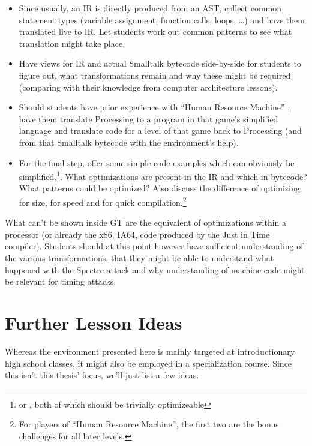 \begin{instructions}
\begin{itemize}
\item Since usually, an \ac{IR} is directly produced from an \ac{AST}, collect common statement types (variable assignment, function calls, loops, \dots) and have them translated live to \ac{IR}. Let students work out common patterns to see what translation might take place.
\item Have views for \ac{IR} and actual Smalltalk bytecode side-by-side for students to figure out, what transformations remain and why these might be required (comparing with their knowledge from computer architecture lessons).
\item Should students have prior experience with ``Human Resource Machine'' \cite{Tom15}, have them translate Processing to a program in that game's simplified language and translate code for a level of that game back to Processing (and from that Smalltalk bytecode with the environment's help).
\item For the final step, offer some simple code examples which can obviously be simplified.\footnote{\eg {} or , both of which should be trivially optimizeable}. What optimizations are present in the \ac{IR} and which in bytecode? What patterns could be optimized? Also discuss the difference of optimizing for size, for speed and for quick compilation.\footnote{For players of ``Human Resource Machine'', the first two are the bonus challenges for all later levels.}
\end{itemize}
\item What can't be shown inside \ac{GT} are the equivalent of optimizations within a processor (or already the x86, IA64, \etc code produced by the Just in Time compiler). Students should at this point however have sufficient understanding of the various transformations, that they might be able to understand what happened \eg with the Spectre attack \cite{Koc19} and why understanding of machine code might be relevant for timing attacks.
\end{instructions}



\section{Further Lesson Ideas} \label{sc_lesson_other}

Whereas the environment presented here is mainly targeted at introductionary high school classes, it might also be employed in a specialization course. Since this isn't this thesis' focus, we'll just list a few ideas:

